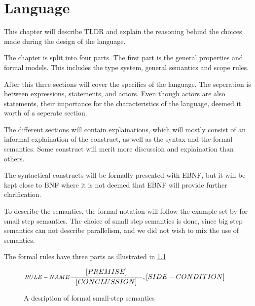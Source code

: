 \chapter{Language}\label{part:design}

This chapter will describe TLDR and explain the reasoning behind the choices made during the design of the language.

The chapter is split into four parts. The first part is the general properties and formal models. This includes the type system, general semantics and scope rules.

After this three sections will cover the specifics of the language. The seperation is between expressions, statements, and actors. Even though actors are also statements, their importance for the characteristics of the language, deemed it worth of a seperate section.

The different sections will contain explainations, which will mostly consist of an informal explaination of the construct, as well as the syntax and the formal semantics. Some construct will merit more discussion and explaination than others.

The syntactical constructs will be formally presented with EBNF, but it will be kept close to BNF where it is not deemed that EBNF will provide further clarification. 

To describe the semantics, the formal notation will follow the example set by  for small step semantics. The choice of small step semantics is done, since big step semantics can not describe parallelism, and we did not wish to mix the use of semantics.

The formal rules have three parts as illustrated in \cref{SS-semantics}

\begin{figure}[H]
\begin{align*}
&\inference[$RULE-NAME$]{[PREMISE]}
                        {[CONCLUSSION]}
                        {,[SIDE-CONDITION]}
\end{align*}
\caption{A desription of formal small-step semantics}
\label{SS-semantics}
\end{figure}








